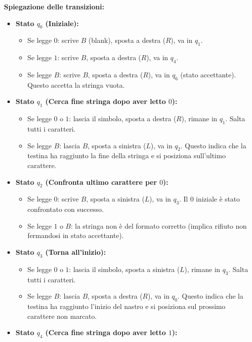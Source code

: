 \documentclass[a4paper, 11pt]{book} %
\theoremstyle{definition}
\begin{document}
\vspace{0.5cm}
\noindent \textbf{Spiegazione delle transizioni:}
\begin{itemize}
    \item \textbf{Stato $q_0$ (Iniziale):}
    \begin{itemize}
        \item Se legge $0$: scrive $B$ (blank), sposta a destra ($R$), va in $q_1$.
        \item Se legge $1$: scrive $B$, sposta a destra ($R$), va in $q_4$.
        \item Se legge $B$: scrive $B$, sposta a destra ($R$), va in $q_6$ (stato accettante). Questo accetta la stringa vuota.
    \end{itemize}
    \item \textbf{Stato $q_1$ (Cerca fine stringa dopo aver letto $0$):}
    \begin{itemize}
        \item Se legge $0$ o $1$: lascia il simbolo, sposta a destra ($R$), rimane in $q_1$. Salta tutti i caratteri.
        \item Se legge $B$: lascia $B$, sposta a sinistra ($L$), va in $q_2$. Questo indica che la testina ha raggiunto la fine della stringa e si posiziona sull'ultimo carattere.
    \end{itemize}
    \item \textbf{Stato $q_2$ (Confronta ultimo carattere per $0$):}
    \begin{itemize}
        \item Se legge $0$: scrive $B$, sposta a sinistra ($L$), va in $q_3$. Il $0$ iniziale è stato confrontato con successo.
        \item Se legge $1$ o $B$: la stringa non è del formato corretto (implica rifiuto non fermandosi in stato accettante).
    \end{itemize}
    \item \textbf{Stato $q_3$ (Torna all'inizio):}
    \begin{itemize}
        \item Se legge $0$ o $1$: lascia il simbolo, sposta a sinistra ($L$), rimane in $q_3$. Salta tutti i caratteri.
        \item Se legge $B$: lascia $B$, sposta a destra ($R$), va in $q_0$. Questo indica che la testina ha raggiunto l'inizio del nastro e si posiziona sul prossimo carattere non marcato.
    \end{itemize}
    \item \textbf{Stato $q_4$ (Cerca fine stringa dopo aver letto $1$):}

\end{itemize}
\end{document}
